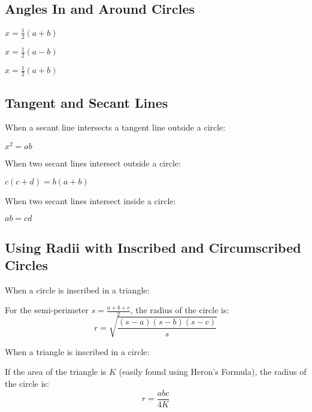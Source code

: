 \documentclass[final, letterpaper, 12pt]{article}
\begin{document}
	\subsection{Angles In and Around Circles}\label{sec: properties of arcs and angles of tangent and secant lines}
		
		
		 $x = \frac{1}{2}(a+b)$
		
		 $x = \frac{1}{2}(a-b)$
		
		 $x = \frac{1}{2}(a+b)$
		
		
	\subsection{Tangent and Secant Lines}\label{sec: properties of the lengths of tangent and secant lines}
	
		When a secant line intersects a tangent line outside a circle:
		
		 $x^2 = ab$
		
		When two secant lines intersect outside a circle:
		
		 $c(c+d) = b(a+b)$
		
		When two secant lines intersect inside a circle:
		
		 $ab = cd$
		
	\subsection{Using Radii with Inscribed and Circumscribed Circles}\label{sec: special formulae that involve triangles and circles}
	
		When a circle is inscribed in a triangle:
		
		
		
		For the semi-perimeter $s = \frac{a+b+c}{2}$, the radius of the circle is:
		\begin{equation}
			r = \sqrt{\frac{(s-a)(s-b)(s-c)}{s}}
		\end{equation}
		
		When a triangle is inscribed in a circle:
		
		
		
		If the area of the triangle is $K$ (easily found using Heron's Formula), the radius of the circle is:
		\begin{equation}
			r = \frac{abc}{4K}
		\end{equation}
	
\end{document}
